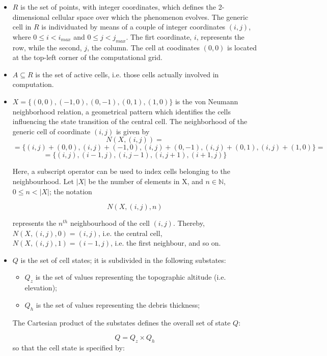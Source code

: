 \begin{itemize}

\item $R$ is the set of points, with integer coordinates, which
  defines the 2-dimensional cellular space over which the phenomenon
  evolves. The generic cell in $R$ is individuated by means of a
  couple of integer coordinates $(i, j)$, where $0 \leq i < i_{max}$
  and $0 \leq j < j_{max}$. The firt coordinate, $i$, represents the
  row, while the second, $j$, the column. The cell at coodinates
  $(0,0)$ is located at the top-left corner of the computational grid.

\item $A \subseteq R$ is the set of active cells, i.e. those cells
  actually involved in computation.

\item $X = \{(0,0), (-1, 0), (0, -1), (0, 1), (1, 0)\}$ is the von
  Neumann neighborhood relation, a geometrical pattern which
  identifies the cells influencing the state transition of the central
  cell. The neighborhood of the generic cell of coordinate $(i, j)$ is
  given by
$$N(X, (i, j)) =$$
$$= \{(i, j)+(0,0), (i, j)+(-1, 0), (i, j)+(0, -1),
(i, j)+(0, 1), (i, j)+(1, 0)\} =$$
$$= \{(i, j), (i-1, j), (i, j-1), (i, j+1), (i+1, j)\}$$

Here, a subscript operator can be used to index cells belonging to the
neighbourhood. Let $|X|$ be the number of elements in X, and $n \in
\mathbb{N}$, $0 \leq n < |X|$; the notation

$$N(X, (i, j), n)$$

represents the $n^{th}$ neighbourhood of the cell $(i,j)$. Thereby, $N(X, (i, j), 0) = (i, j)$, i.e. the central cell, $N(X, (i, j), 1) = (i-1, j)$, i.e. the first neighbour, and so on.

\item $Q$ is the set of cell states; it is subdivided in the following
  substates:

\begin{itemize}
    \item   $Q_z$ is the set of values representing the topographic altitude (i.e. elevation);
    \item   $Q_h$ is the set of values representing the debris thickness;
\end{itemize}

The Cartesian product of the substates defines the overall set of
state $Q$:

$$Q = Q_z \times Q_h$$
so that the cell state is specified by:


\end{itemize}
